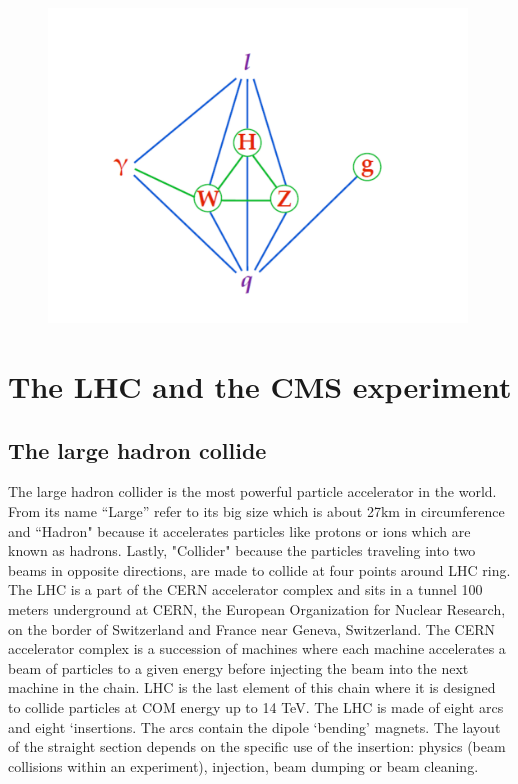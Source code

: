 \begin{figure}[t!]
\centering
\includegraphics[width=0.99\textwidth]{figures/SM_coupling.png}
\caption[interactions between fundamental particles]{
\label{fig:SMcoupling}}
\end{figure}
\chapter{The LHC and the CMS experiment}
\section{The large hadron collide}
The large hadron collider is the most powerful particle accelerator in the world. From its name “Large” refer to its big size which is about 27km in circumference and “Hadron" because it accelerates particles like protons or ions which are known as hadrons.
Lastly, "Collider" because the particles traveling into two beams in opposite directions, are made to collide at four points around LHC ring.  
The LHC is a part of the CERN accelerator complex and sits in a tunnel 100 meters underground at CERN, the European Organization for Nuclear Research, on the border of Switzerland and France near Geneva, Switzerland.   
The CERN accelerator complex is a succession of machines where each machine accelerates a beam of particles to a given energy before injecting the beam into the next machine in the chain. LHC is the last element of this chain where it is designed to collide particles at COM energy up to 14 TeV.
The LHC is made of eight arcs and eight ‘insertions. The arcs contain the dipole ‘bending’ magnets. The layout of the straight section depends on the specific use of the insertion: physics (beam collisions within an experiment), injection, beam dumping or beam cleaning.

